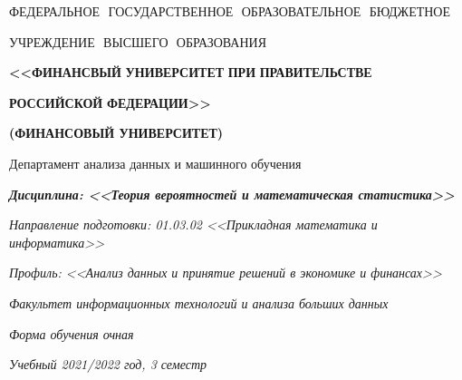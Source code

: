 \centerline{\footnotesize{ФЕДЕРАЛЬНОЕ\,\, ГОСУДАРСТВЕННОЕ\,\, ОБРАЗОВАТЕЛЬНОЕ\,\, БЮДЖЕТНОЕ}}
\centerline{\footnotesize{УЧРЕЖДЕНИЕ\,\, ВЫСШЕГО\,\, ОБРАЗОВАНИЯ}}

\centerline{\small{\textbf{<<ФИНАНСВЫЙ\,\,УНИВЕРСИТЕТ\,\,ПРИ\,\,ПРАВИТЕЛЬСТВЕ}}}
\centerline{\small{\textbf{РОССИЙСКОЙ\,\,ФЕДЕРАЦИИ>>}}}
\centerline{\small{\textbf{(ФИНАНСОВЫЙ УНИВЕРСИТЕТ)}}}

\hfill \break
\normalsize{Департамент анализа данных и машинного обучения}\\

\hfill \break
\centerline{\normalsize{{\textit{\textbf{Дисциплина: <<Теория вероятностей и математическая статистика>>}}}}}
\centerline{\small{\textit{Направление подготовки: 01.03.02 <<Прикладная математика и информатика>>}}}
\centerline{\small{\textit{Профиль: <<Анализ данных и принятие решений в экономике и финансах>>}}}
\centerline{\small{\textit{Факультет информационных технологий и анализа больших данных}}}
\centerline{\small{\textit{Форма обучения очная}}}
\centerline{\small{\textit{Учебный 2021/2022 год, 3 семестр}}}

\hfill \break
